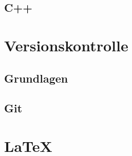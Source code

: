 \section{C++}


\chapter{Versionskontrolle}
\section{Grundlagen}
\section{Git}


\chapter{LaTeX}



